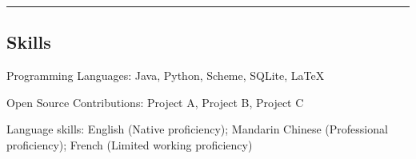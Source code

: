 \documentclass[10pt,letterpaper]{article}
\newenvironment{indentsection}[1]%
{\begin{list}{}%
	{\setlength{\leftmargin}{#1}}%
	\item[]%
}
{\end{list}}
\begin{document}
\hrule
\vspace{-0.4em}
\subsection*{Skills}

\begin{indentsection}{\parindent}
\begin{description*}
	\item[Programming Languages:]
	Java, Python, Scheme, SQLite, \LaTeX
	\item[Open Source Contributions:]
	Project A, Project B, Project C
	\item[Language skills:] English (Native proficiency); Mandarin Chinese (Professional proficiency); French (Limited working proficiency)
\end{description*}
\end{indentsection}
\end{document}
